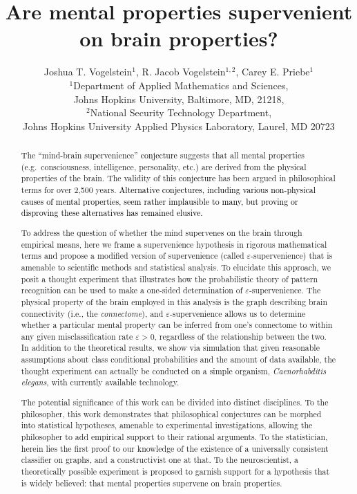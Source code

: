 \documentclass{article}
\title{Are mental properties supervenient on brain properties?}
\author{Joshua T. Vogelstein$^1$, R. Jacob Vogelstein$^{1,2}$, Carey E. Priebe$^1$\\
$^1$Department of Applied Mathematics and Sciences, \\ Johns Hopkins University, Baltimore, MD, 21218,\\ $^2$National Security Technology Department, \\ Johns Hopkins University Applied Physics Laboratory, Laurel, MD 20723}
\providecommand{\tr}[1]{\textcolor{black}{#1}}
\begin{document}
\maketitle
\begin{abstract}

	The ``mind-brain supervenience'' \tr{conjecture} suggests that all mental properties (e.g.\ consciousness, intelligence, personality, etc.) are derived from the physical properties of the brain. The validity of this \tr{conjecture} has been argued in philosophical terms for over 2,500 years. \tr{Alternative conjectures, including various non-physical causes of mental properties, seem rather implausible to many, but proving or disproving these alternatives has remained elusive.}  

	To address the question of whether the mind supervenes on the brain through empirical means, here we frame a supervenience hypothesis in rigorous mathematical terms and propose a modified version of supervenience (called $\varepsilon$-supervenience) that is amenable to scientific methods and statistical analysis. To elucidate this approach, we posit a thought experiment that illustrates how the probabilistic theory of pattern recognition can be used to make a one-sided determination of $\varepsilon$-supervenience. The physical property of the brain employed in this analysis is the graph describing brain connectivity (i.e., the \emph{connectome}), and $\varepsilon$-supervenience allows us to determine whether a particular mental property can be inferred from one's connectome to within any given misclassification rate $\varepsilon > 0$, regardless of the relationship between the two. In addition to the theoretical results, we show via simulation that given reasonable assumptions about class conditional probabilities and the amount of data available, the thought experiment can actually be conducted on a simple organism, \emph{Caenorhabditis elegans}, with currently available technology.

	The potential significance of this work can be divided into distinct disciplines.  To the philosopher, this work demonstrates that philosophical conjectures can be morphed into statistical hypotheses, amenable to experimental investigations, allowing the philosopher to add empirical support to their rational arguments.  To the statistician, herein lies the first proof to our knowledge of the existence of a universally consistent classifier on graphs, and a constructivist one at that.  To the neuroscientist, a theoretically possible experiment is proposed to garnish support for a hypothesis that is widely believed: that mental properties supervene on brain properties.


\end{abstract}
\end{document}
